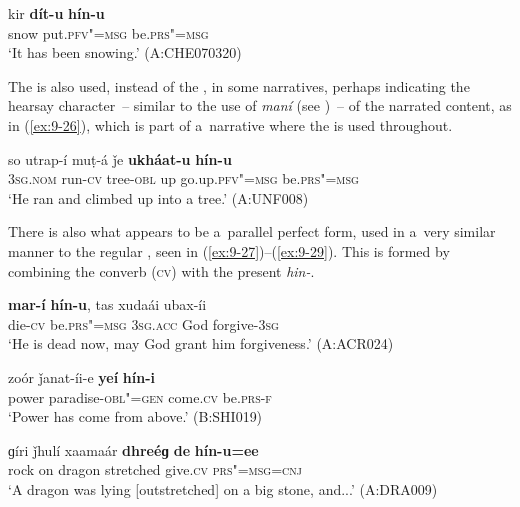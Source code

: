 \begin{exe}
\ex
\label{ex:9-25}
\gll kir \textbf{dít-u} \textbf{hín-u} \\
snow put.\textsc{pfv"=msg} be.\textsc{prs"=msg} \\
\glt `It has been snowing.' (A:CHE070320)
\end{exe}

The  is also used, instead of the , in some narratives, perhaps indicating the hearsay character~-- similar to the use of \textit{maní} (see )~-- of the narrated content, as in (\ref{ex:9-26}), which is part of a~narrative where the  is used throughout.

\begin{exe}
\ex
\label{ex:9-26}
\gll so utrap-í muṭ-á ǰe \textbf{ukháat-u} \textbf{hín-u} \\
\textsc{3sg.nom} run-\textsc{cv} tree-\textsc{obl} up go.up.\textsc{pfv"=msg} be.\textsc{prs"=msg} \\
\glt `He ran and climbed up into a tree.' (A:UNF008) 
\end{exe}

There is also what appears to be a~parallel perfect form, used in a~very similar manner to the regular , seen in (\ref{ex:9-27})--(\ref{ex:9-29}). This is formed by combining the converb (\textsc{cv}) with the present   \textit{hin-}.

\begin{exe}
\ex
\label{ex:9-27}
\gll \textbf{mar-í} \textbf{hín-u}, tas xudaái ubax-íi \\
die-\textsc{cv} be.\textsc{prs"=msg} \textsc{3sg.acc} God forgive-\textsc{3sg} \\
\glt `He is dead now, may God grant him forgiveness.' (A:ACR024)

\ex
\label{ex:9-28}
\gll zoór ǰanat-íi-e \textbf{yeí} \textbf{hín-i} \\
power paradise-\textsc{obl"=gen} come.\textsc{cv} be.\textsc{prs-f} \\
\glt `Power has come from above.' (B:SHI019)

\ex
\label{ex:9-29}
\gll ɡíri ǰhulí xaamaár \textbf{dhreéɡ} \textbf{de} \textbf{hín-u=ee} \\
rock on dragon stretched give.\textsc{cv} \textsc{prs"=msg=cnj} \\
\glt `A dragon was lying [outstretched] on a big stone, and...' (A:DRA009)
\end{exe}

